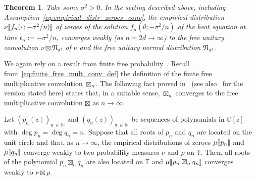 \documentclass[10pt]{amsart}
\newtheorem{theo}{Theorem}[section]
\theoremstyle{definition}\newtheorem{defi}[theo]{Definition}\newtheorem{rema}[theo]{Remark}\newtheorem{exam}[theo]{Example}\newtheorem{exem}[theo]{Example}\newtheorem{nota}[theo]{Notation}
\newcommand{\llbracket}{\mathopen{[\mkern -2.7mu[}}
\newcommand{\rrbracket}{\mathclose{]\mkern -2.7mu]}}
\newcommand{\lsem}{\llbracket}
\newcommand{\rsem}{\rrbracket}
\newcommand{\fnorm}{\mathfrak{N}}
\newcommand{\bT}{\mathbb{T}}
\newcommand{\N}{\mathbb{N}}
\newcommand{\C}{\mathbb{C}}
\begin{document}
\begin{theo}\label{theo:heat_flow_zeroes}
Take some $\sigma^2>0$. In the setting described above, including Assumption~\eqref{eq:empirical_distr_zeroes_conv}, the empirical distribution $\nu\lsem f_{n}(\cdot\,;-\sigma^2/n)\rsem$ of zeroes of the solution $f_{n}(\theta; -\sigma^2/n)$ of the heat equation at time $t_{n} := -\sigma^2/n$, converges weakly (as $n=2d\to\infty$) to the free unitary convolution $\nu \boxtimes \fnorm_{\sigma^2}$ of $\nu$ and the free unitary normal distribution $\fnorm_{\sigma^2}$.
\end{theo}


We again rely on a result from finite free probability~\cite{marcus_spielman_srivastava,marcus}. Recall from~\eqref{eq:finite_free_mult_conv_def} the definition of the finite free multiplicative convolution $\boxtimes_{n}$. The following fact proved in~\cite[Proposition~3.4]{arizmendi_garza_vargas_perales} (see also~\cite[Proposition~2.9]{kabluchko_rep_diff_free_poi} for the version stated here) states that, in a suitable sense, $\boxtimes_n$ converges to the free multiplicative convolution $\boxtimes$ as $n\to\infty$.

\begin{prop}\label{prop:finite_free_mult_conv_to_free_mult}
Let $(p_n(z))_{n\,\in\,\N}$ and $(q_n(z))_{n\,\in\,\N}$ be sequences of polynomials in $\C[z]$ with $\deg p_n = \deg q_n = n$. Suppose that all roots of $p_n$ and $q_n$ are located on the unit circle and that, as $n\to\infty$, the empirical distributions of zeroes $\mu\lsem p_{n}\rsem$ and $\mu\lsem q_{n}\rsem$ converge weakly to two probability measures $\nu$ and $\rho$ on $\bT$. Then, all roots of the polynomial $p_n \boxtimes_n q_n$ are also located on $\bT$ and $\mu \lsem p_n \boxtimes_n q_n\rsem$ converges weakly to $\nu \boxtimes \rho$.
\end{prop}
\end{document}
